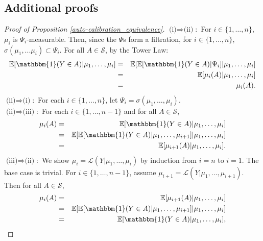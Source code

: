 \documentclass[aap]{imsart}
\theoremstyle{plain}
\theoremstyle{definition}
\begin{document}
\begin{appendix}
\section*{Additional proofs}\label{appn}

\begin{proof}[Proof of Proposition \ref{auto-calibration_equivalence}]
  $\text{(i)} \Rightarrow \text{(ii)}$:\, For $i \in \{1, \ldots, n\}$, $\mu_i$ is $\Psi_i$-measurable. Then, since the $\Psi$s form a filtration, for $i \in \{1,\ldots,n\}$, $\sigma(\mu_1,...\mu_i) \subset \Psi_i$. For all $A \in \mathcal{S}$, by the Tower Law:
\begin{eqnarray*}
  \mathbb{E}[\mathbbm{1}(Y \in A)|\mu_1, \ldots, \mu_i] & = & \mathbb{E}[\mathbb{E}[\mathbbm{1}(Y \in A)|\Psi_i]|\mu_1, \ldots, \mu_i] \\
                                                        & = & \mathbb{E}[\mu_i(A)|\mu_1, \ldots, \mu_i] \\
                                                        & = & \mu_i(A).
\end{eqnarray*}
  $\text{(ii)} \Rightarrow \text{(i)}$:\, For each $i \in \{1, \ldots, n\}$, let $\Psi_i = \sigma(\mu_1, \ldots, \mu_i)$. \\
  $\text{(ii)} \Rightarrow \text{(iii)}$:\, For each $i \in \{1, \ldots, n-1\}$ and for all $A \in \mathcal{S}$,
\begin{eqnarray*}
  \mu_i(A) & = & \mathbb{E}[\mathbbm{1}(Y \in A)|\mu_1, \ldots, \mu_i] \\
           & = & \mathbb{E}[\mathbb{E}[\mathbbm{1}(Y \in A)|\mu_1, \ldots, \mu_{i+1}]|\mu_1, \ldots, \mu_i] \\
           & = & \mathbb{E}[\mu_{i+1}(A)|\mu_1, \ldots, \mu_i].
\end{eqnarray*}
  $\text{(iii)} \Rightarrow \text{(ii)}$:\, We show $\mu_i = \mathcal{L}(Y|\mu_1, \ldots, \mu_i)$ by induction from $i = n$ to $i = 1$. The base case is trivial. For $i \in \{1, \ldots, n-1\}$, assume $\mu_{i+1} = \mathcal{L}(Y|\mu_1, \ldots, \mu_{i+1})$. Then for all $A \in \mathcal{S}$,
\begin{eqnarray*}
  \mu_i(A) & = & \mathbb{E}[\mu_{i+1}(A)|\mu_1, \ldots, \mu_i] \\
           & = & \mathbb{E}[\mathbb{E}[\mathbbm{1}(Y \in A)|\mu_1, \ldots, \mu_{i+1}]|\mu_1, \ldots, \mu_i] \\
           & = & \mathbb{E}[\mathbbm{1}(Y \in A)|\mu_1, \ldots, \mu_i],
\end{eqnarray*}

\end{proof}
\end{appendix}
\end{document}
